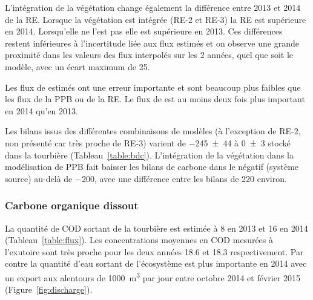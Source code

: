 L'intégration de la végétation change également la différence entre 2013 et 2014 de la RE.
Lorsque la végétation est intégrée (RE-2 et RE-3) la RE est supérieure en 2014.
Lorsqu'elle ne l'est pas elle est supérieure en 2013.
Ces différences restent inférieures à l'incertitude liée aux flux estimés et on observe une grande proximité dans les valeurs des flux interpolés sur les 2 années, quel  que soit le modèle, avec un écart maximum de \SI{25}{\gcma}.


Les flux de \chh estimés ont une erreur importante et sont beaucoup plus faibles que les flux de la PPB ou de la RE.
Le flux de \chh est au moins deux fois plus important en 2014 qu'en 2013.

Les bilans issus des différentes combinaisons de modèles (à l'exception de RE-2, non présenté car très proche de RE-3) varient de \SI{-245(44)}{\gcma} à \SI{0(3)}{\gcma} stocké dans la tourbière (Tableau~\ref{table:bdc}).
L'intégration de la végétation dans la modélisation de PPB fait baisser les bilans de carbone dans le négatif (système source) au-delà de \SI{-200}{\gcma}, avec une différence entre les bilans de \SI{220}{\gcma} environ.




\subsubsection{Carbone organique dissout}

La quantité de COD sortant de la tourbière est estimée à \SI{8}{\gcma} en 2013 et \SI{16}{\gcma} en 2014 (Tableau~\ref{table:flux}).
Les concentrations moyennes en COD mesurées à l'exutoire sont très proche pour les deux années \num{18.6} et \SI{18.3}{\mgl} respectivement.
Par contre la quantité d'eau sortant de l'écosystème est plus importante en 2014 avec un export aux alentours de \SI{1000}{\cubic\metre} par jour entre octobre 2014 et février 2015 (Figure~\ref{fig:discharge}).

